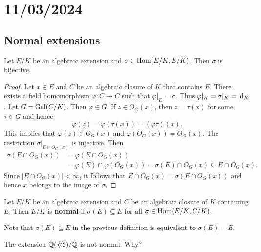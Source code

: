 \section{11/03/2024}


\subsection{Normal extensions}

\begin{proposition}
    Let $E/K$ be an algebraic extension and $\sigma\in\operatorname{Hom}(E/K,E/K)$. 
    Then $\sigma$ is bijective. 
\end{proposition}

\begin{proof}
    Let $x\in E$ and 
    $C$ be an algebraic closure of $K$ that contains $E$. There
    exists a field homomorphism $\varphi\colon C\to C$ such that $\varphi|_E=\sigma$. 
    Thus $\varphi|_K=\sigma|_K=\operatorname{id}_K$. Let $G=\operatorname{Gal}(C/K)$. Then  
    $\varphi\in G$. If $z\in O_G(x)$, 
    then $z=\tau(x)$ for some $\tau\in G$ and hence
    \[
    \varphi(z)=\varphi(\tau(x))=(\varphi\tau)(x). 
    \]
    This implies that $\varphi(z)\in O_G(x)$ 
    and $\varphi(O_G(x))=O_G(x)$. The restriction
    $\sigma|_{E\cap O_G(x)}$ is injective. Then 
    \begin{align*}
        \sigma(E\cap O_G(x))&=\varphi(E\cap O_G(x))\\
        &=\varphi(E)\cap\varphi(O_G(x))
        =\sigma(E)\cap O_G(x)\subseteq E\cap O_G(x).
        \end{align*}
    Since $|E\cap O_G(x)|<\infty$, it follows that $E\cap O_G(x)=\sigma(E\cap O_G(x))$ and
    hence $x$ belongs to the image of $\sigma$. 
\end{proof}



\begin{definition}
    Let $E/K$ be an algebraic extension and $C$ be an algebraic closure of $K$ containing $E$. Then $E/K$ is \textbf{normal} if 
    $\sigma(E)\subseteq E$ for all $\sigma\in\operatorname{Hom}(E/K,C/K)$. 
\end{definition}

Note that $\sigma(E)\subseteq E$ in the previous definition
is equivalent to $\sigma(E)=E$. 

\begin{example}
    The extension $\mathbb{Q}(\sqrt[3]{2})/\mathbb{Q}$ is not normal. Why?
\end{example}

